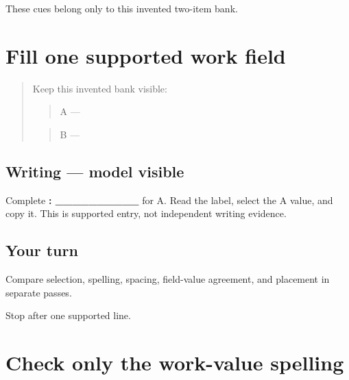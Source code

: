 \begin{tcolorbox}[breakable,colback=teal!4,colframe=teal!35!black,title={Before you move on}]
These cues belong only to this invented two-item bank.
\end{tcolorbox}
\section[\texorpdfstring{\pa{ਕੰਮ}: \_\_\_\_\_\_\_\_\_\_ (work field)}{ਕੰਮ: \_\_\_\_\_\_\_\_\_\_ (work field)}]{Fill one supported work field}

\label{lesson:PA-W05-work-supported}



\begin{quote}
Keep this invented bank visible:

\begin{quote}
A — \textbf{}
\end{quote}

\begin{quote}
B — \textbf{}
\end{quote}
\end{quote}

\subsection*{Writing — model visible}
Complete \textbf{: \_\_\_\_\_\_\_\_\_\_} for A. Read the label, select the A value, and copy it. This is supported entry, not independent writing evidence.

\subsection*{Your turn}
Compare selection, spelling, spacing, field-value agreement, and placement in separate passes.

\begin{tcolorbox}[breakable,colback=teal!4,colframe=teal!35!black,title={Before you move on}]
Stop after one supported line.
\end{tcolorbox}
\section[\texorpdfstring{\pa{ਖੇਤੀ} / \pa{ਨੌਕਰੀ} (work-value spelling)}{ਖੇਤੀ / ਨੌਕਰੀ (work-value spelling)}]{Check only the work-value spelling}

\label{lesson:PA-W05-work-spelling}



